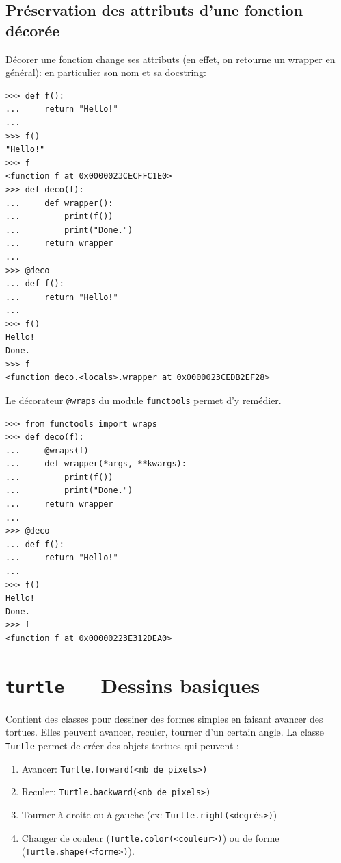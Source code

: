 \documentclass[a4paper, 10pt]{article}
\begin{document}
\subsection{Préservation des attributs d'une fonction décorée}
Décorer  une fonction change ses attributs (en effet, on retourne un wrapper en général): en particulier
son nom et sa docstring:

\begin{verbatim}
>>> def f():
...     return "Hello!"
...
>>> f()
"Hello!"
>>> f
<function f at 0x0000023CECFFC1E0>
>>> def deco(f):
...     def wrapper():
...         print(f())
...         print("Done.")
...     return wrapper
...
>>> @deco
... def f():
...     return "Hello!"
...
>>> f()
Hello!
Done.
>>> f
<function deco.<locals>.wrapper at 0x0000023CEDB2EF28>
\end{verbatim}

Le décorateur \texttt{@wraps} du module \texttt{functools} permet d'y remédier.
\begin{verbatim}
>>> from functools import wraps
>>> def deco(f):
...     @wraps(f)
...     def wrapper(*args, **kwargs):
...         print(f())
...         print("Done.")
...     return wrapper
...
>>> @deco
... def f():
...     return "Hello!"
...
>>> f()
Hello!
Done.
>>> f
<function f at 0x00000223E312DEA0>
\end{verbatim}

\section[{\footnotesize\texttt{turtle}} --- Dessins basiques]{{\normalfont\bfseries\large\texttt{turtle}} --- Dessins basiques}

Contient des classes pour dessiner des formes simples en faisant avancer des tortues. Elles peuvent avancer, reculer, tourner d'un certain angle.
La classe \texttt{Turtle} permet de créer des objets tortues qui peuvent :
\begin{enumerate}
    \item Avancer: \texttt{Turtle.forward(<nb de pixels>)}
    \item Reculer: \texttt{Turtle.backward(<nb de pixels>)}
    \item Tourner à droite ou à gauche (ex: \texttt{Turtle.right(<degrés>)})
    \item Changer de couleur (\texttt{Turtle.color(<couleur>)}) ou de forme (\texttt{Turtle.shape(<forme>)}).
\end{enumerate}
\end{document}
